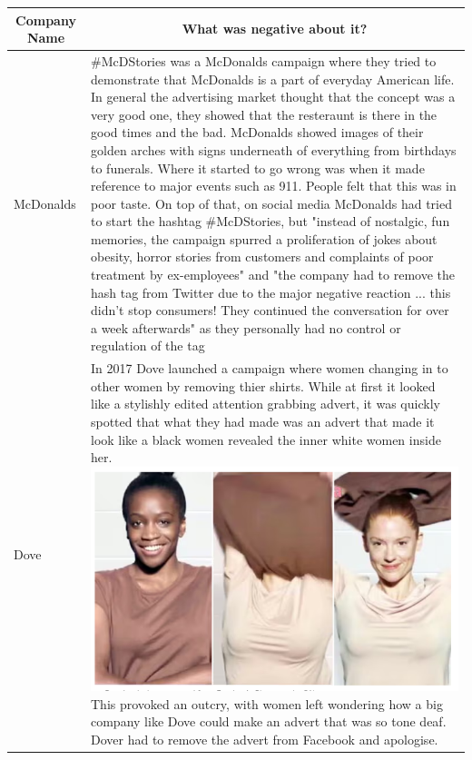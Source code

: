 \documentclass{article}
\begin{document}
\begin{table}[htbp]
    \centering
    \begin{tabular}{|p{}|p{}|}
       \hline
       \multicolumn{1}{c}{\bfseries Company Name} & \multicolumn{1}{c}{\bfseries What was negative about it?}  \\
             \hline
	McDonalds & \#McDStories was a McDonalds campaign where they tried to demonstrate that McDonalds is a part of everyday American life. In general the advertising market thought that the concept was a very good one, they showed that the resteraunt is there in the good times and the bad. McDonalds showed images of their golden arches with signs underneath of everything from birthdays to funerals. Where it started to go wrong was when it made reference to major events such as 911. People felt that this was in poor taste. On top of that, on social media McDonalds had tried to start the hashtag \#McDStories, but "instead of nostalgic, fun memories, the campaign spurred a proliferation of jokes about obesity, horror stories from customers and complaints of poor treatment by ex-employees" and "the company had to remove the hash tag from Twitter due to the major negative reaction ... this didn’t stop consumers! They continued the conversation for over a week afterwards" as they personally had no control or regulation of the tag \cite{McD} \\
        \hline
	Dove & In 2017 Dove launched a campaign where women changing in to other women by removing thier shirts. While at first it looked like a stylishly edited attention grabbing advert, it was quickly spotted that what they had made was an advert that made it look like a black women revealed the inner white women inside her. \includegraphics[scale=0.4]{Dove} \cite{Dove} This provoked an outcry, with women left wondering how a big company like Dove could make an advert that was so tone deaf. Dover had to remove the advert from Facebook and apologise. \\
        \hline
    \end{tabular}
\end{table}
\end{document}
